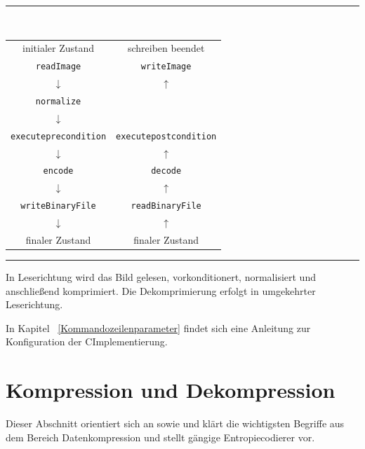 \documentclass[a4paper,12pt]{article}
\newcommand{\CC}{C\nolinebreak\hspace{-.05em}\raisebox{.4ex}{\tiny\bf+}\nolinebreak\hspace{-.10em}\raisebox{.4ex}{\tiny\bf+}\;}
\begin{document}
\begin{center}
{\color{gray!50!blue}\rule{9cm}{0.1mm}}
\vspace{0.2cm}
\\
\begin{tabular}{c c}
initialer Zustand & schreiben beendet 
\\
{\tt{readImage}} & {\tt{writeImage}}
\\
$\downarrow$ & $\uparrow$ 
\\
{\tt{normalize}} & 
\\
$\downarrow$ & 
\\
{\tt{execute{\tt{pre}}condition}} & {\tt{execute{\tt{post}}condition}}
\\
$\downarrow$ & $\uparrow$ 
\\
{\tt{encode}} & {\tt{decode}}
\\
$\downarrow$ & $\uparrow$ 
\\
{\tt{writeBinaryFile}} & {\tt{readBinaryFile}}
\\
$\downarrow$ & $\uparrow$ 
\\
finaler Zustand & finaler Zustand
\end{tabular}
{\color{gray!50!red}\rule{9cm}{0.1mm}}
\vspace{0.5cm}
\end{center}
In Leserichtung wird das Bild gelesen, vorkonditionert, normalisiert und 
anschließend komprimiert.
Die Dekomprimierung erfolgt in umgekehrter Leserichtung. 
\par
In Kapitel ~\ref{Kommandozeilenparameter} findet sich eine Anleitung zur Konfiguration der \CC Implementierung.
\newpage
\section{Kompression und Dekompression}
Dieser Abschnitt orientiert sich an\cite{henne} sowie \cite{Lajmi} und klärt die wichtigsten Begriffe aus dem Bereich Datenkompression und stellt gängige Entropiecodierer vor.
\end{document}
